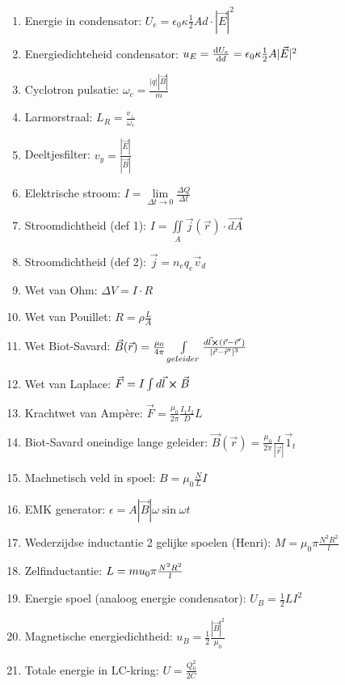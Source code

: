 \documentclass[12pt]{article}
\begin{document}
\begin{enumerate}
	    \item Energie in condensator: $ U_e = \epsilon_0 \kappa \frac{1}{2} A d \cdot |\vec{E}|^2 $
	    \item Energiedichteheid condensator: $ u_E = \dv{U_e}{d} = \epsilon_0 \kappa \frac{1}{2} A |\vec{E}|^2 $
	    \item Cyclotron pulsatie: $ \omega_c = \frac{|q||\vec{B}|}{m} $
	    \item Larmorstraal: $ L_R = \frac{v_{\perp}}{\omega_c} $
	    \item Deeltjesfilter:  $v_y = \frac{|\vec{E}|}{|\vec{B}|} $
	    \item Elektrische stroom: $ I = \lim\limits_{\Delta t \to 0} \frac{ \Delta Q}{\Delta t} $
	    \item Stroomdichtheid (def 1):  $ I = \iint\limits_A \vec{j}(\vec{r})\cdot \vec{dA} $
	    \item Stroomdichtheid (def 2): $ \vec{j} = n_e q_e \vec{v}_d $
	    \item Wet van Ohm: $\Delta V = I \cdot R $
	    \item Wet van Pouillet:  $ R = \rho \frac{L}{A} $
	    \item Wet Biot-Savard: $ \vec{B}(\vec{r}) = \frac{\mu_0}{4\pi} \int\limits_{geleider} \frac{d\vec{l}\cross (\vec{r}-\vec{r}')}{|\vec{r}-\vec{r}'|^3}$
	    \item Wet van Laplace: $ \vec{F} = I \int d\vec{l}\cross \vec{B} $
	    \item Krachtwet van Amp\`ere: $ \vec{F} = \frac{\mu_0}{2\pi}\frac{I_1 I_2}{D}L $
	    \item Biot-Savard oneindige lange geleider: $ \vec{B}(\vec{r}) = \frac{\mu_0}{2\pi}\frac{I}{|\vec{r}|}\vec{1}_t$
	    \item Machnetisch veld in spoel: $ B = \mu_0 \frac{N}{L} I $
	    \item EMK generator: $ \epsilon = A |\vec{B}| \omega \sin{\omega t}$
	    \item Wederzijdse inductantie 2 gelijke spoelen (Henri): $ M = \mu_0 \pi \frac{N^2 R^2}{l} $
	    \item Zelfinductantie: $ L = \\mu_0\pi \frac{N^2R^2}{l} $
	    \item Energie spoel (analoog energie condensator): $ U_B = \frac{1}{2} LI^2 $
	    \item Magnetische energiedichtheid: $ u_B = \frac{1}{2} \frac{|\vec{B}|^2}{\mu_0} $
	    \item Totale energie in LC-kring: $ U = \frac{Q_0^2}{2C} $

\end{enumerate}
\end{document}
